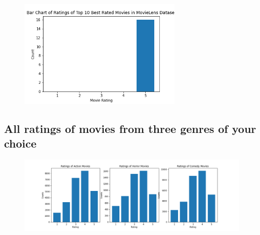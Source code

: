 \documentclass{article}
\begin{document}
\begin{figure}[H] \begin{center}
\includegraphics[width=0.7\textwidth]{basicvisualizations/Bar Chart of Top 10 Best Rated Movies Ratings.png}
\end{center} \end{figure}

\subsection{All ratings of movies from three genres of your choice}

\begin{figure}[H] \begin{center}
\includegraphics[width=\textwidth]{basicvisualizations/Bar Charts of Ratings by Genre.png}
\end{center} \end{figure}
\end{document}
